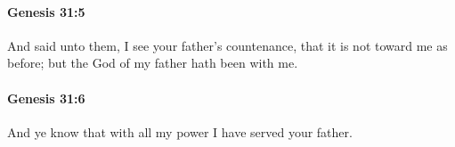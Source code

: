 		\paragraph{Genesis 31:5} %
			\label{GENESIS-31-5}

			And said unto them, I see your father's countenance, that it is not toward me as before; but the God of my father hath been with me.


		\paragraph{Genesis 31:6} %
			\label{GENESIS-31-6}

			And ye know that with all my power I have served your father.


